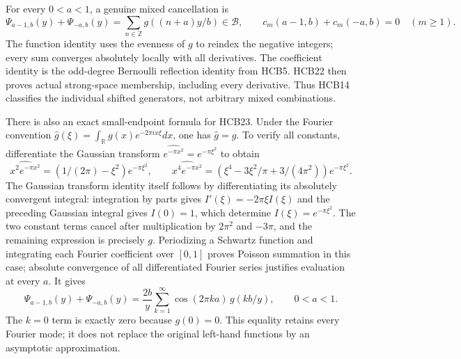 \documentclass[11pt]{article}
\begin{document}
For every $0<a<1$, a genuine mixed cancellation is
\begin{equation}\tag{HCB23}
 \Psi_{a-1,b}(y)+\Psi_{-a,b}(y)
      =\sum_{n\in\mathbb Z}g((n+a)y/b)\in\mathcal B,
 \qquad c_m(a-1,b)+c_m(-a,b)=0\quad(m\geq1).
\end{equation}
The function identity uses the evenness of $g$ to reindex the
negative integers; every sum converges absolutely locally with all
derivatives. The coefficient identity is the odd-degree Bernoulli
reflection identity from HCB5. HCB22 then proves actual strong-space
membership, including every derivative. Thus HCB14 classifies the
individual shifted generators, not arbitrary mixed combinations.

There is also an exact small-endpoint formula for HCB23. Under the
Fourier convention $\widehat g(\xi)=\int_{\mathbb R}
g(x)e^{-2\pi i x\xi}dx$, one has $\widehat g=g$. To verify all
constants, differentiate the Gaussian transform
$\widehat {e^{-\pi x^2}}=e^{-\pi\xi^2}$ to obtain
\[
 \widehat{x^2e^{-\pi x^2}}
   =(1/(2\pi)-\xi^2)e^{-\pi\xi^2},\qquad
 \widehat{x^4e^{-\pi x^2}}
   =(\xi^4-3\xi^2/\pi+3/(4\pi^2))e^{-\pi\xi^2}.
\]
The Gaussian transform identity itself follows by differentiating
its absolutely convergent integral: integration by parts gives
$I'(\xi)=-2\pi\xi I(\xi)$ and the preceding Gaussian integral
gives $I(0)=1$, which determine $I(\xi)=e^{-\pi\xi^2}$.
The two constant terms cancel after multiplication by $2\pi^2$
and $-3\pi$, and the remaining expression is precisely $g$.
Periodizing a Schwartz function and integrating each Fourier
coefficient over $[0,1]$ proves Poisson summation in this case;
absolute convergence of all differentiated Fourier series justifies
evaluation at every $a$. It gives
\begin{equation}\tag{HCB24}
 \Psi_{a-1,b}(y)+\Psi_{-a,b}(y)
    =\frac{2b}{y}\sum_{k=1}^{\infty}
             \cos(2\pi k a)\,g(kb/y),\qquad0<a<1.
\end{equation}
The $k=0$ term is exactly zero because $g(0)=0$. This equality
retains every Fourier mode; it does not replace the original
left-hand functions by an asymptotic approximation.
\end{document}
